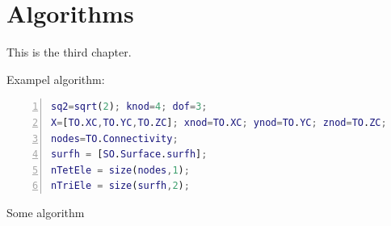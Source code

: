 
\chapter{Algorithms}

This is the third chapter.

Exampel algorithm:

\begin{algorithm}[h]
\begin{lstlisting}[language=Matlab,numbers=left,numberstyle={\footnotesize},basicstyle={\ttfamily},breaklines=true,keywordstyle={\color{blue}}]
sq2=sqrt(2); knod=4; dof=3;
X=[TO.XC,TO.YC,TO.ZC]; xnod=TO.XC; ynod=TO.YC; znod=TO.ZC; 
nodes=TO.Connectivity; 
surfh = [SO.Surface.surfh]; 
nTetEle = size(nodes,1); 
nTriEle = size(surfh,2);
\end{lstlisting}
\protect\caption{Some algorithm}
\end{algorithm}

